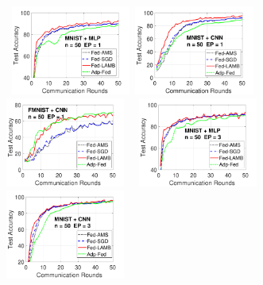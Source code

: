 \documentclass[manuscript,screen,review]{acmart}
\begin{document}
\begin{figure}[t]
    \begin{center}
        \mbox{
        \hspace{-0.1in}\includegraphics[width=0.35\textwidth]{new_fmnist_mnist_fig/mnist_testerror_mlp_ep1_iid0_reddi.pdf}
        \hspace{-0.1in}\includegraphics[width=0.35\textwidth]{new_fmnist_mnist_fig/mnist_testerror_cnn_ep1_iid0_reddi.pdf}
        \hspace{-0.1in}\includegraphics[width=0.35\textwidth]{new_fmnist_mnist_fig/fmnist_testerror_cnn_ep1_iid0_reddi.pdf}
        }
        \mbox{
        \hspace{-0.1in}\includegraphics[width=0.35\textwidth]{new_fmnist_mnist_fig/mnist_testerror_mlp_ep3_iid0_reddi.pdf}
        \hspace{-0.1in}\includegraphics[width=0.35\textwidth]{new_fmnist_mnist_fig/mnist_testerror_cnn_ep3_iid0_reddi.pdf}
}
\end{center}
\end{figure}
\end{document}
